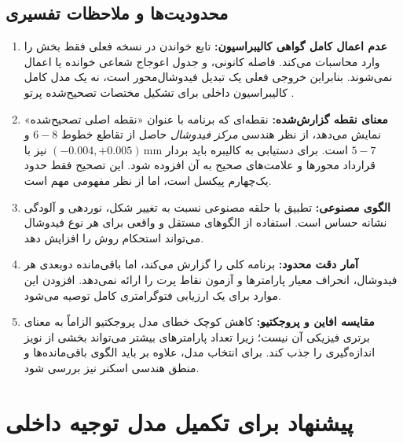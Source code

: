 \documentclass[12pt,a4paper]{article}
\newcommand{\code}[1]{\lr{\texttt{\detokenize{#1}}}}
\begin{document}
\subsection{محدودیت‌ها و ملاحظات تفسیری}

\begin{enumerate}[rightmargin=1.4em]
  \item \textbf{عدم اعمال کامل گواهی کالیبراسیون:}
  تابع خواندن \code{RC20.txt} در نسخه فعلی فقط بخش \code{$FIDUCIALS} را وارد
  محاسبات می‌کند. فاصله کانونی،  و جدول اعوجاج شعاعی خوانده یا اعمال
  نمی‌شوند. بنابراین خروجی فعلی یک تبدیل فیدوشال‌محور است، نه یک مدل کامل
  کالیبراسیون داخلی برای تشکیل مختصات تصحیح‌شده پرتو
  \cite{brown1971calibration,wolf2014elements}.

  \item \textbf{معنای نقطه گزارش‌شده:}
  نقطه‌ای که برنامه با عنوان «نقطه اصلی تصحیح‌شده» نمایش می‌دهد، از نظر هندسی
  \emph{مرکز فیدوشال} حاصل از تقاطع خطوط \(6\!-\!8\) و \(5\!-\!7\) است. برای
  دستیابی به  کالیبره باید بردار
  \((-0.004,+0.005)\,\mathrm{mm}\) نیز با قرارداد محورها و علامت‌های صحیح به آن افزوده
  شود. این تصحیح فقط حدود یک‌چهارم پیکسل است، اما از نظر مفهومی مهم است.

  \item \textbf{الگوی مصنوعی:}
  تطبیق با حلقه مصنوعی نسبت به تغییر شکل، نوردهی و آلودگی نشانه حساس است. استفاده از
  الگوهای مستقل و واقعی برای هر نوع فیدوشال می‌تواند استحکام روش را افزایش دهد.

  \item \textbf{آمار دقت محدود:}
  برنامه  کلی را گزارش می‌کند، اما باقی‌مانده دوبعدی هر فیدوشال، انحراف
  معیار پارامترها و آزمون نقاط پرت را ارائه نمی‌دهد. افزودن این موارد برای یک
  ارزیابی فتوگرامتری کامل توصیه می‌شود.

  \item \textbf{مقایسه افاین و پروجکتیو:}
  کاهش کوچک خطای مدل پروجکتیو الزاماً به معنای برتری فیزیکی آن نیست؛ زیرا تعداد
  پارامترهای بیشتر می‌تواند بخشی از نویز اندازه‌گیری را جذب کند. برای انتخاب مدل،
  علاوه بر  باید الگوی باقی‌مانده‌ها و منطق هندسی اسکنر نیز بررسی شود.
\end{enumerate}

\section{پیشنهاد برای تکمیل مدل توجیه داخلی}
\end{document}
